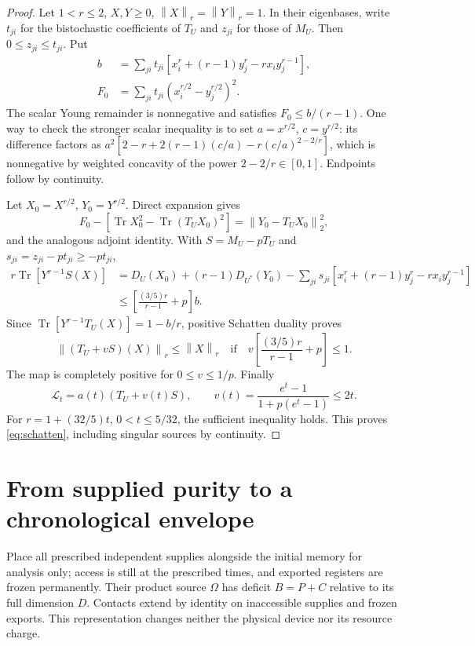 \documentclass[11pt]{article}
\theoremstyle{definition}
\theoremstyle{remark}
\DeclareMathOperator{\Tr}{Tr}
\newcommand{\norm}[1]{\left\lVert#1\right\rVert}
\begin{document}
\begin{proof}
Let $1<r\le2$, $X,Y\ge0$, $\norm X_r=\norm Y_r=1$. In their eigenbases, write $t_{ji}$ for the bistochastic coefficients of $T_U$ and $z_{ji}$ for those of $M_U$. Then $0\le z_{ji}\le t_{ji}$. Put
\begin{align*}
 b&=\sum_{ji}t_{ji}\left[x_i^r+(r-1)y_j^r-rx_iy_j^{r-1}\right],\\
 F_0&=\sum_{ji}t_{ji}(x_i^{r/2}-y_j^{r/2})^2.
\end{align*}
The scalar Young remainder is nonnegative and satisfies $F_0\le b/(r-1)$. One way to check the stronger scalar inequality is to set $a=x^{r/2}$, $c=y^{r/2}$: its difference factors as $a^2[2-r+2(r-1)(c/a)-r(c/a)^{2-2/r}]$, which is nonnegative by weighted concavity of the power $2-2/r\in[0,1]$. Endpoints follow by continuity.

Let $X_0=X^{r/2}$, $Y_0=Y^{r/2}$. Direct expansion gives
\[
 F_0-[\Tr X_0^2-\Tr(T_U X_0)^2]
 =\norm{Y_0-T_U X_0}_2^2,
\]
and the analogous adjoint identity. With $S=M_U-pT_U$ and $s_{ji}=z_{ji}-pt_{ji}\ge-pt_{ji}$,
\begin{align*}
 r\Tr[Y^{r-1}S(X)]
 &=D_U(X_0)+(r-1)D_{U^*}(Y_0)
   -\sum_{ji}s_{ji}\left[x_i^r+(r-1)y_j^r-rx_iy_j^{r-1}\right]\\
 &\le\left[\frac{(3/5)r}{r-1}+p\right]b.
\end{align*}
Since $\Tr[Y^{r-1}T_U(X)]=1-b/r$, positive Schatten duality proves
\[
 \norm{(T_U+vS)(X)}_r\le\norm X_r
 \quad\text{if}\quad
 v\left[\frac{(3/5)r}{r-1}+p\right]\le1.
\]
The map is completely positive for $0\le v\le1/p$. Finally
\[
 \mathcal L_t=a(t)(T_U+v(t)S),\qquad
 v(t)=\frac{e^t-1}{1+p(e^t-1)}\le2t.
\]
For $r=1+(32/5)t$, $0<t\le5/32$, the sufficient inequality holds. This proves \eqref{eq:schatten}, including singular sources by continuity.
\end{proof}

\section{From supplied purity to a chronological envelope}\label{app:prefix}

Place all prescribed independent supplies alongside the initial memory for analysis only; access is still at the prescribed times, and exported registers are frozen permanently. Their product source $\Omega$ has deficit $B=P+C$ relative to its full dimension $D$. Contacts extend by identity on inaccessible supplies and frozen exports. This representation changes neither the physical device nor its resource charge.
\end{document}

